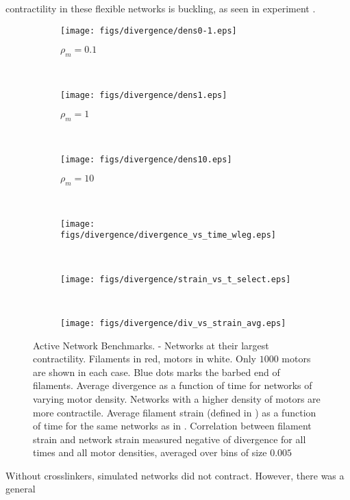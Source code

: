 \documentclass[12pt]{article}
\begin{document}
contractility in these flexible networks is buckling, as seen in experiment \cite{murrell2012}. 
\begin{figure}[H] 
  \begin{subfigure}{0.25\textwidth}
    \centering
    \caption{\label{fig:rholo}$\rho_m=0.1$}
    \texttt{[image: figs/divergence/dens0-1.eps]}
  \end{subfigure}
  ~
  \begin{subfigure}{0.25\textwidth}
    \centering
    \caption{$\rho_m=1$}
    \texttt{[image: figs/divergence/dens1.eps]}
  \end{subfigure}
  ~
  \begin{subfigure}{0.25\textwidth}
    \centering
    \caption{\label{fig:rhohi}$\rho_m = 10$}
    \texttt{[image: figs/divergence/dens10.eps]}
  \end{subfigure}
  ~
  \begin{subfigure}{0.32\textwidth}
    \centering
    \texttt{[image: figs/divergence/divergence\_vs\_time\_wleg.eps]}
    \caption{\label{fig:div_vs_t}}
  \end{subfigure}
  ~
  \begin{subfigure}{0.32\textwidth}
    \centering
    \texttt{[image: figs/divergence/strain\_vs\_t\_select.eps]}
    \caption{\label{fig:strain_vs_t}}
  \end{subfigure}
  ~
  \begin{subfigure}{0.32\textwidth}
    \centering
    \texttt{[image: figs/divergence/div\_vs\_strain\_avg.eps]}
    \caption{\label{fig:div_vs_strain}}
  \end{subfigure}
  \caption{%
  \label{fig:contract}%
  Active Network Benchmarks. - 
  Networks at their largest contractility. Filaments in red, motors in white. Only $1000$ motors are shown in each case.
  Blue dots marks the barbed end of filaments.  Average divergence as a function of time for
  networks of varying motor density. Networks with a higher density of motors are more contractile.  
  Average filament strain (defined in ) as a function of time for the same networks as in
  .  Correlation between filament strain and network strain measured 
 negative of divergence for all times and all motor densities, averaged over bins of size $0.005$} 
\end{figure}
Without crosslinkers, simulated networks did not contract. However, there was a general
\end{document}
